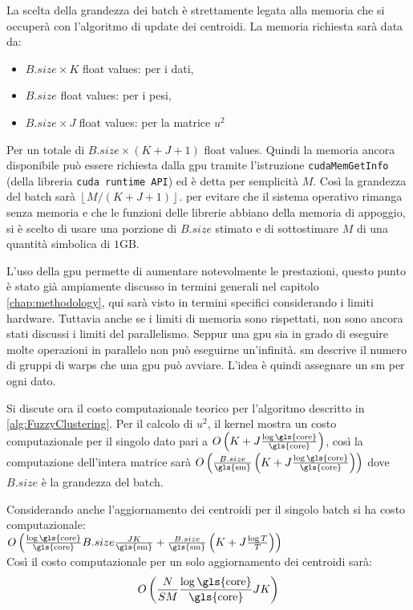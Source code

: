 \begin{toDo}
	\noindent La scelta della grandezza dei batch è strettamente legata alla memoria che si occuperà con l'algoritmo di update dei centroidi. La memoria richiesta sarà data da:
	\begin{itemize}
		\item $B.size \times K$ float values: per i dati,
		\item $B.size$ float values: per i pesi,
		\item $B.size \times J$ float values: per la matrice $u^2$
	\end{itemize}
	Per un totale di $B.size \times (K+J+1)$ float values. Quindi la memoria ancora disponibile può essere richiesta dalla \gls{gpu} tramite l'istruzione \texttt{cudaMemGetInfo} (della libreria \texttt{cuda runtime API}) ed è detta per semplicità $M$. Così la grandezza del batch sarà $\left\lfloor M / (K + J+1)\right\rfloor$. per evitare che il sistema operativo rimanga senza memoria e che le funzioni delle librerie abbiano della memoria di appoggio, si è scelto di usare una porzione di $B.size$ stimato e di sottostimare $M$ di una quantità simbolica di $1\mathrm{GB}$.

	\bigskip\noindent L'uso della \gls{gpu} permette di aumentare notevolmente le prestazioni, questo punto è stato già ampiamente discusso in termini generali nel capitolo \cref{chap:methodology}, qui sarà visto in termini specifici considerando i limiti hardware. Tuttavia anche se i limiti di memoria sono rispettati, non sono ancora stati discussi i limiti del parallelismo. Seppur una \gls{gpu} sia in grado di eseguire molte operazioni in parallelo non può eseguirne un'infinità. \gls{sm} descrive il numero di gruppi di warps che una \gls{gpu} può avviare. L'idea è quindi assegnare un \gls{sm} per ogni dato.

	\noindent Si discute ora il costo computazionale teorico per l'algoritmo descritto in \cref{alg:FuzzyClustering}. Per il calcolo di $u^2$, il kernel mostra un costo computazionale per il singolo dato pari a $O\left(K + J\frac{\log \text{\gls{core}}}{\text{\gls{core}}}\right)$, così la computazione dell'intera matrice sarà $O\left(\frac{B.size}{\text{\gls{sm}}}\left(K + J\frac{\log \text{\gls{core}}}{\text{\gls{core}}}\right)\right)$ dove $B.size$ è la grandezza del batch.

	\noindent Considerando anche l'aggiornamento dei centroidi per il singolo batch si ha costo computazionale:\\ $O\left(\frac{\log \text{\gls{core}}}{\text{\gls{core}}}B.size\frac{JK}{\text{\gls{sm}}} + \frac{B.size}{\text{\gls{sm}}}\left(K + J\frac{\log T}{T}\right)\right)$\\
	Così il costo computazionale per un solo aggiornamento dei centroidi sarà:
	\[
		O\left(\frac{N}{SM}\frac{\log \text{\gls{core}}}{\text{\gls{core}}}JK\right)
	\]


\end{toDo}
